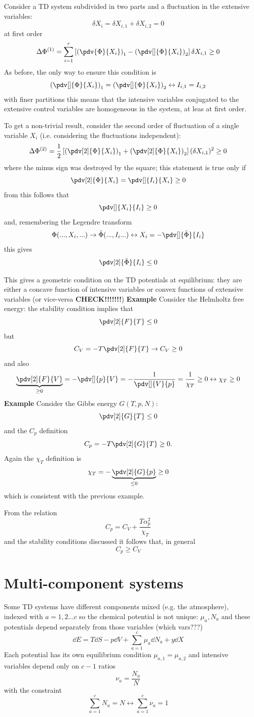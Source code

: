 Consider a TD system subdivided in two parts and a fluctuation in the extensive
variables:
$$\delta X_i = \delta X_{i,1} + \delta X_{i,2} = 0$$
at first order
$$\Delta\Phi^{(1)} = \sum_{i=1}^{r}\left[\left(\pdv{\Phi}{X_i}\right)_1 -
\left(\pdv[]{\Phi}{X_i}\right)_2\right]\delta X_{i,1}\geq0$$
As before, the only way to ensure this condition is
$$\left(\pdv[]{\Phi}{X_i}\right)_1 = \left(\pdv[]{\Phi}{X_i}\right)_2 
\leftrightarrow I_{i,1} = I_{i,2}$$
with finer partitions this means that the intensive variables conjugated to the
extensive control variables are homogeneous in the system, at leas at first order.

To get a non-trivial result, consider the second order of fluctuation of a single
variable $X_i$ (i.e. considering the fluctuations independent):
$$\Delta\Phi^{(2)} = \frac{1}{2}\left[\left(\pdv[2]{\Phi}{X_i}\right)_1 +
\left(\pdv[2]{\Phi}{X_i}\right)_2\right](\delta X_{i,1})^2\geq0	$$
where the minus sign was destroyed by the square; this statement is true only if
$$\pdv[2]{\Phi}{X_i} = \pdv[]{I_i}{X_i}\geq0$$
from this follows that
$$\pdv[]{X_i}{I_i}\geq0$$
and, remembering the Legendre transform
$$\Phi(...,X_i,...)\rightarrow\tilde\Phi(...,I_i...) \leftrightarrow X_i =
-\pdv[]{\tilde\Phi}{I_i}$$
this gives
$$\pdv[2]{\tilde \Phi}{I_i}\leq0$$

This gives a geometric condition on the TD potentials at equilibrium: they are either
a concave function of intensive variables or convex functions of extensive
variables (or vice-versa \textbf{CHECK!!!!!!!})
\textbf{Example} Consider the Helmholtz free energy: the stability condition
implies that
$$\pdv[2]{F}{T}\leq0$$
but
$$C_V = -T\pdv[2]{F}{T}\rightarrow C_V\geq0$$
and also
$$\underbrace{\pdv[2]{F}{V}}_{\geq0}=-\pdv[]{p}{V} = -\frac{1}{\pdv[]{V}{p}} =
\frac{1}{\chi_T}\geq0 \leftrightarrow \chi_T\geq0$$
\textbf{Example} Consider the Gibbs energy $G(T,p,N)$:
$$\pdv[2]{G}{T}\leq0$$
and the $C_p$ definition
$$C_p = -T\pdv[2]{G}{T}\geq0.$$
Again the $\chi_T$ definition is
$$\chi_T = -\underbrace{\pdv[2]{G}{p}}_{\leq0}\geq0$$
which is consistent with the previous example.

From the relation
$$C_p = C_V + \frac{T\alpha_p^2}{\chi_T}$$
and the stability conditions discussed it follows that, in general
$$C_p\geq C_V$$
\section{Multi-component systems}
Some TD systems have different components mixed (e.g. the atmosphere), indexed with
$a=1,2...c$ so the chemical potential is not unique: $\mu_a,N_a$ and these potentials
depend separately from those variables (which vars???)
$$\dd E = T\dd S -p\dd V + \sum_{a=1}^{c}\mu_a \dd N_a + y\dd X$$
Each potential has its own equilibrium condition $\mu_{a,1} = \mu_{a,2}$ and
intensive variables depend only on $c-1$ ratios
$$\nu_a = \frac{N_a}{N}$$
with the constraint
$$\sum_{a=1}^{c}N_a =N\leftrightarrow\sum_{a=1}^{c}\nu_a=1$$

